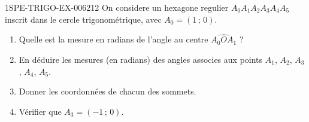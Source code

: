 \begin{exercice}{1SPE-TRIGO-EX-006}{2}{12}
On considere un hexagone regulier $A_0A_1A_2A_3A_4A_5$ inscrit dans le cercle trigonométrique, avec $A_0 = (1\,;\,0)$.
\begin{enumerate}
  \item Quelle est la mesure en radians de l'angle au centre $\widehat{A_0OA_1}$ ?
  \item En déduire les mesures (en radians) des angles associes aux points $A_1$, $A_2$, $A_3$, $A_4$, $A_5$.
  \item Donner les coordonnées de chacun des sommets.
  \item Vérifier que $A_3 = (-1\,;\,0)$.
\end{enumerate}
\end{exercice}
